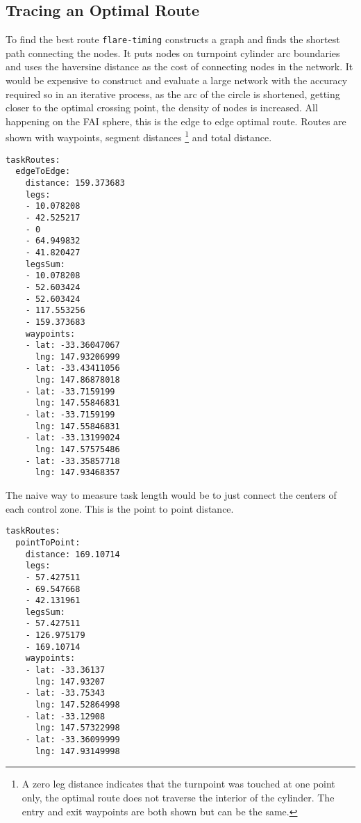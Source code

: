 \documentclass[gap.tex]{subfiles}
\begin{document}
\newpage
\subsection{Tracing an Optimal Route}

To find the best route \texttt{flare-timing} constructs a graph and finds the
shortest path connecting the nodes. It puts nodes on turnpoint cylinder arc
boundaries and uses the haversine distance as the cost of connecting nodes in
the network. It would be expensive to construct and evaluate a large network
with the accuracy required so in an iterative process, as the arc of the circle
is shortened, getting closer to the optimal crossing point, the density of
nodes is increased. All happening on the FAI sphere, this is the edge to edge
optimal route. Routes are shown with waypoints, segment distances \footnote{A
zero leg distance indicates that the turnpoint was touched at one point only,
the optimal route does not traverse the interior of the cylinder. The entry and
exit waypoints are both shown but can be the same.} and total distance.

\begin{lstlisting}[caption={Edge to edge distance of the optimal route, \texttt{edgeToEdge} node of \texttt{*.task-length.yaml}.}]
taskRoutes:
  edgeToEdge:
    distance: 159.373683
    legs:
    - 10.078208
    - 42.525217
    - 0
    - 64.949832
    - 41.820427
    legsSum:
    - 10.078208
    - 52.603424
    - 52.603424
    - 117.553256
    - 159.373683
    waypoints:
    - lat: -33.36047067
      lng: 147.93206999
    - lat: -33.43411056
      lng: 147.86878018
    - lat: -33.7159199
      lng: 147.55846831
    - lat: -33.7159199
      lng: 147.55846831
    - lat: -33.13199024
      lng: 147.57575486
    - lat: -33.35857718
      lng: 147.93468357
\end{lstlisting}

The naive way to measure task length would be to just connect the centers of
each control zone. This is the point to point distance.

\begin{lstlisting}[caption={Point to point distance of a non-optimal route,
\texttt{pointToPoint} node of \texttt{*.task-length.yaml}.}]
taskRoutes:
  pointToPoint:
    distance: 169.10714
    legs:
    - 57.427511
    - 69.547668
    - 42.131961
    legsSum:
    - 57.427511
    - 126.975179
    - 169.10714
    waypoints:
    - lat: -33.36137
      lng: 147.93207
    - lat: -33.75343
      lng: 147.52864998
    - lat: -33.12908
      lng: 147.57322998
    - lat: -33.36099999
      lng: 147.93149998
\end{lstlisting}
\end{document}
